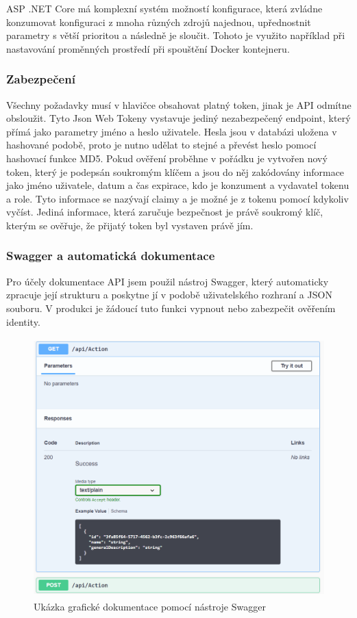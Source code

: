 \documentclass[
  biblatex,
  glossaries,
  index
]{kidiplom}
\begin{document}
ASP .NET Core má komplexní systém možností konfigurace, která zvládne konzumovat konfiguraci z mnoha různých zdrojů najednou, upřednostnit parametry s větší prioritou a následně je sloučit. Tohoto je využito například při nastavování proměnných prostředí při spouštění Docker kontejneru.

\subsubsection{Zabezpečení}
Všechny požadavky musí v hlavičce obsahovat platný token, jinak je API odmítne obsloužit. Tyto Json Web Tokeny vystavuje jediný nezabezpečený endpoint, který přímá jako parametry jméno a heslo uživatele. Hesla jsou v databázi uložena v hashované podobě, proto je nutno udělat to stejné a převést heslo pomocí hashovací funkce MD5. Pokud ověření proběhne v pořádku je vytvořen nový token, který je podepsán soukromým klíčem a jsou do něj zakódovány informace jako jméno uživatele, datum a čas expirace, kdo je konzument a vydavatel tokenu a role. Tyto informace se nazývají claimy a je možné je z tokenu pomocí kdykoliv vyčíst. Jediná informace, která zaručuje bezpečnost je právě soukromý klíč, kterým se ověřuje, že přijatý token byl vystaven právě jím.

\subsubsection{Swagger a automatická dokumentace}
Pro účely dokumentace API jsem použil nástroj Swagger, který automaticky zpracuje její strukturu a poskytne jí v podobě uživatelského rozhraní a JSON souboru. V produkci je žádoucí tuto funkci vypnout nebo zabezpečit ověřením identity.

\begin{figure}[H]
  	\centering
 	 \includegraphics[width=14cm,height=10cm,keepaspectratio]{Swagger_UI}
 	 \caption{Ukázka grafické dokumentace pomocí nástroje Swagger}
\end{figure}
\end{document}

